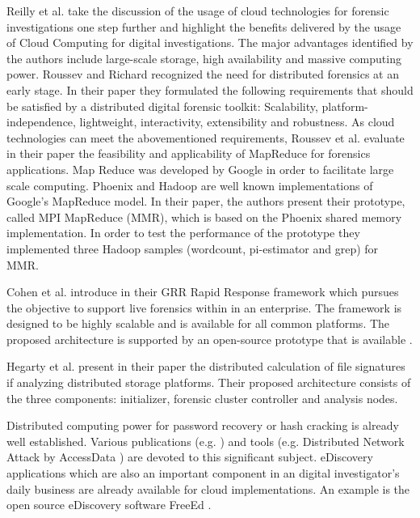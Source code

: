 \documentclass[runningheads,a4paper]{llncs}
\begin{document}
Reilly et al. \cite{Reilly2010} take the discussion of the usage of cloud technologies for forensic investigations one step further and highlight the benefits delivered by the usage of Cloud Computing for digital investigations. The major advantages identified by the authors include large-scale storage, high availability and massive computing power. Roussev and Richard \cite{Roussev2004,Richard2006} recognized the need for distributed forensics at an early stage. In their paper \cite{Roussev2009} they formulated the following requirements that should be satisfied by a distributed digital forensic toolkit: Scalability, platform-independence, lightweight, interactivity, extensibility and robustness. As cloud technologies can meet the abovementioned requirements, Roussev et al. evaluate in their paper \cite{Roussev2009} the feasibility and applicability of MapReduce for forensics applications. Map Reduce \cite{Dean2004} was developed by Google in order to facilitate large scale computing. Phoenix \cite{Talbot} and Hadoop \cite{Hadoop2011a} are well known implementations of Google's MapReduce model. In their paper, the authors present their prototype, called MPI MapReduce (MMR), which is based on the Phoenix shared memory implementation. In order to test the performance of the prototype they implemented three Hadoop samples (wordcount, pi-estimator and grep) for MMR. 

Cohen et al. introduce in \cite{Cohen2011} their GRR Rapid Response framework which pursues the objective to support live forensics within in an enterprise. The framework is designed to be highly scalable and is available for all common platforms. The proposed architecture is supported by an open-source prototype that is available \cite{Cohen2011}. 

Hegarty et al. present in their paper \cite{Hegarty2011} the distributed calculation of file signatures if analyzing distributed storage platforms. Their proposed architecture consists of the three components: initializer, forensic cluster controller and analysis nodes. 

Distributed computing power for password recovery or hash cracking is already well established. Various publications (e.g. \cite{Zonenberg2009}) and tools (e.g. Distributed Network Attack by AccessData \cite{AccessData2011,Starcher2011}) are devoted to this significant subject. eDiscovery applications which are also an important component in an digital investigator's daily business are already available for cloud implementations. An example is the open source eDiscovery software FreeEd \cite{Freeed2011}.
\end{document}
